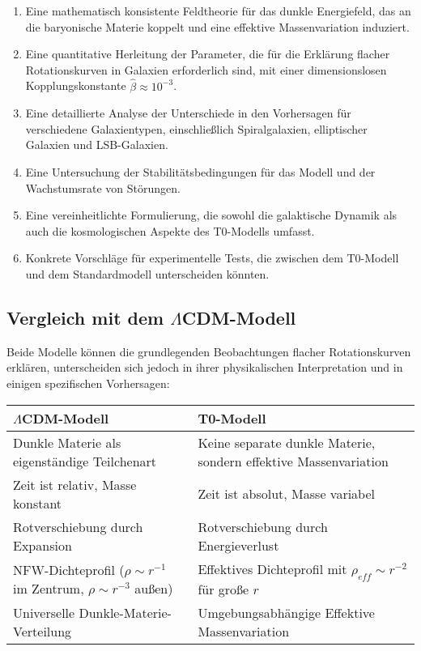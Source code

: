\documentclass[a4paper,12pt]{article}
\begin{document}
	\begin{enumerate}
		\item Eine mathematisch konsistente Feldtheorie für das dunkle Energiefeld, das an die baryonische Materie koppelt und eine effektive Massenvariation induziert.
		
		\item Eine quantitative Herleitung der Parameter, die für die Erklärung flacher Rotationskurven in Galaxien erforderlich sind, mit einer dimensionslosen Kopplungskonstante $\hat{\beta} \approx 10^{-3}$.
		
		\item Eine detaillierte Analyse der Unterschiede in den Vorhersagen für verschiedene Galaxientypen, einschließlich Spiralgalaxien, elliptischer Galaxien und LSB-Galaxien.
		
		\item Eine Untersuchung der Stabilitätsbedingungen für das Modell und der Wachstumsrate von Störungen.
		
		\item Eine vereinheitlichte Formulierung, die sowohl die galaktische Dynamik als auch die kosmologischen Aspekte des T0-Modells umfasst.
		
		\item Konkrete Vorschläge für experimentelle Tests, die zwischen dem T0-Modell und dem Standardmodell unterscheiden könnten.
	\end{enumerate}
	
	\subsection{Vergleich mit dem $\Lambda$CDM-Modell}
	
	Beide Modelle können die grundlegenden Beobachtungen flacher Rotationskurven erklären, unterscheiden sich jedoch in ihrer physikalischen Interpretation und in einigen spezifischen Vorhersagen:
	
	\begin{tcolorbox}[colback=yellow!5!white,colframe=yellow!75!black,title=Vergleich der Modelle]
		\begin{tabular}{|p{}|p{}|}
			\hline
			\textbf{$\Lambda$CDM-Modell} & \textbf{T0-Modell} \\
			\hline
			Dunkle Materie als eigenständige Teilchenart & Keine separate dunkle Materie, sondern effektive Massenvariation \\
			\hline
			Zeit ist relativ, Masse konstant & Zeit ist absolut, Masse variabel \\
			\hline
			Rotverschiebung durch Expansion & Rotverschiebung durch Energieverlust \\
			\hline
			NFW-Dichteprofil ($\rho \sim r^{-1}$ im Zentrum, $\rho \sim r^{-3}$ außen) & Effektives Dichteprofil mit $\rho_{eff} \sim r^{-2}$ für große $r$ \\
			\hline
			Universelle Dunkle-Materie-Verteilung & Umgebungsabhängige Effektive Massenvariation \\
			\hline
		\end{tabular}
	\end{tcolorbox}
	
\end{document}
